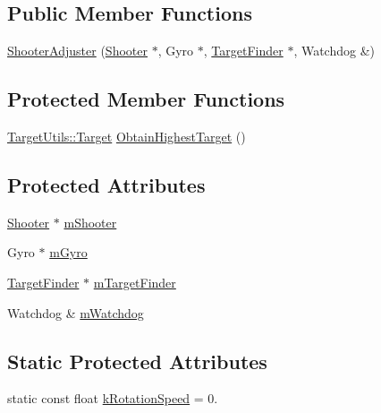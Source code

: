 \subsection*{\-Public \-Member \-Functions}
\begin{DoxyCompactItemize}
\item 
\hyperlink{class_shooter_adjuster_aec63818b4b79db7e2baf7b40ffd8c7f9}{\-Shooter\-Adjuster} (\hyperlink{class_shooter}{\-Shooter} $\ast$, \-Gyro $\ast$, \hyperlink{class_target_finder}{\-Target\-Finder} $\ast$, \-Watchdog \&)
\end{DoxyCompactItemize}
\subsection*{\-Protected \-Member \-Functions}
\begin{DoxyCompactItemize}
\item 
\hyperlink{struct_target_utils_1_1_target}{\-Target\-Utils\-::\-Target} \hyperlink{class_shooter_adjuster_acecdbf763e867021b9b7b39e387609fd}{\-Obtain\-Highest\-Target} ()
\end{DoxyCompactItemize}
\subsection*{\-Protected \-Attributes}
\begin{DoxyCompactItemize}
\item 
\hyperlink{class_shooter}{\-Shooter} $\ast$ \hyperlink{class_shooter_adjuster_a4e7a220158bd064180b2b1aa9d1ac614}{m\-Shooter}
\item 
\-Gyro $\ast$ \hyperlink{class_shooter_adjuster_ad0c5d105a2c182e2e502e8ef8e9452e9}{m\-Gyro}
\item 
\hyperlink{class_target_finder}{\-Target\-Finder} $\ast$ \hyperlink{class_shooter_adjuster_aada6daf6f361af84d6ccb6a416215866}{m\-Target\-Finder}
\item 
\-Watchdog \& \hyperlink{class_shooter_adjuster_a8d4e4deae719e94880c7828f8baed77c}{m\-Watchdog}
\end{DoxyCompactItemize}
\subsection*{\-Static \-Protected \-Attributes}
\begin{DoxyCompactItemize}
\item 
static const float \hyperlink{class_shooter_adjuster_a2c3cb7c557b0db61576a5948227b8c42}{k\-Rotation\-Speed} = 0.
\end{DoxyCompactItemize}


